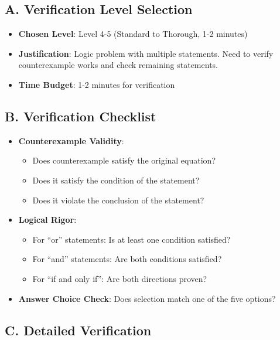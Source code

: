 \documentclass[12pt]{article}
\begin{document}
\begin{verificationbox}
\subsection*{A. Verification Level Selection}
\begin{itemize}[leftmargin=*]
    \item \textbf{Chosen Level}: Level 4-5 (Standard to Thorough, 1-2 minutes)
    \item \textbf{Justification}: Logic problem with multiple statements. Need to verify counterexample works and check remaining statements.
    \item \textbf{Time Budget}: 1-2 minutes for verification
\end{itemize}

\subsection*{B. Verification Checklist}
\begin{itemize}[leftmargin=*]
    \item \textbf{Counterexample Validity}: 
    \begin{itemize}
        \item Does counterexample satisfy the original equation?
        \item Does it satisfy the condition of the statement?
        \item Does it violate the conclusion of the statement?
    \end{itemize}
    \item \textbf{Logical Rigor}: 
    \begin{itemize}
        \item For ``or'' statements: Is at least one condition satisfied?
        \item For ``and'' statements: Are both conditions satisfied?
        \item For ``if and only if'': Are both directions proven?
    \end{itemize}
    \item \textbf{Answer Choice Check}: Does selection match one of the five options?
\end{itemize}

\subsection*{C. Detailed Verification}


\end{verificationbox}
\end{document}
